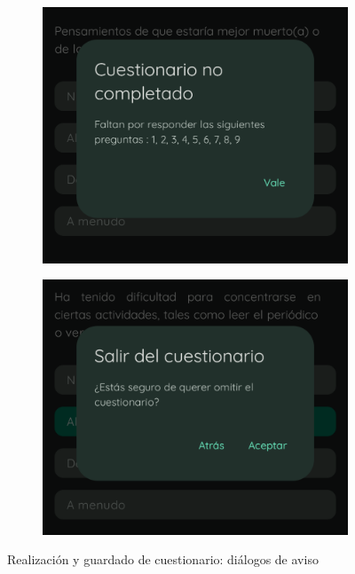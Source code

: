             \begin{figure}[htbp]
                \centering
                \begin{subfigure}[c]{0.4\textwidth}
                    \centering
                    \includegraphics[width=1\textwidth]{figures/pruebas/realizacion_cuestionario/Preguntas restantes.png}
                \end{subfigure}
                \hspace{0.1\textwidth}
                \begin{subfigure}[c]{0.4\textwidth}
                    \centering
                    \includegraphics[width=1\linewidth]{figures/pruebas/realizacion_cuestionario/Salir del cuestionario.png}
                \end{subfigure}
                \caption{Realización y guardado de cuestionario: diálogos de aviso}
                \label{figure:pruebas:visualizacion_local:dialogos}
            \end{figure}


